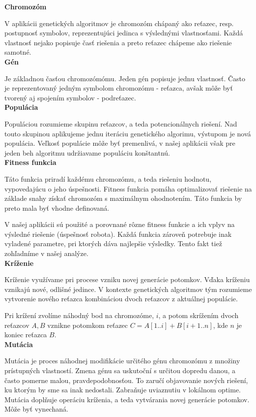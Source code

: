 \documentclass[10pt]{paper}
\begin{document}
\textbf{Chromozóm}

V aplikácii genetických algoritmov je chromozóm chápaný ako reťazec, resp. postupnosť symbolov, reprezentujúci jedinca s výslednými vlastnosťami. Každá vlastnosť nejako popisuje časť riešenia a preto reťazec chápeme ako riešenie samotné.\\

\textbf{Gén}

Je základnou časťou chromozómómu. Jeden gén popisuje jednu vlastnosť. Často je reprezentovaný jedným symbolom chromozómu - reťazca, avšak môže byť tvorený aj spojením symbolov - podreťazec.\\

\textbf{Populácia}

Populáciou rozumieme skupinu reťazcov, a teda potencionálnych riešení. Nad touto skupinou aplikujeme jednu iteráciu genetického algorimu, výstupom je nová populácia. Veľkosť populácie môže byť premenlivá, v našej aplikácii však pre jeden beh algoritmu udržiavame populáciu konštantnú.\\

\textbf{Fitness funkcia}

Táto funkcia priradí každému chromozómu, a teda riešeniu hodnotu, vypovedajúcu o jeho úspešnosti. Fitness funkcia pomáha optimalizovať riešenie na základe snahy získať chromozóm s maximálnym ohodnotením. Táto funkcia by preto mala byť vhodne definovaná.

V našej aplikácii sú použité a porovnané rôzne fitness funkcie a ich vplyv na výsledné riešenie (úspešnosť robota). Každá funkcia zároveň potrebuje inak vyladené parametre, pri ktorých dáva najlepšie výsledky. Tento fakt tiež zohľadníme v našej analýze.\\

\textbf{Kríženie}

Kríženie využívame pri procese vzniku novej generácie potomkov. Vďaka kríženiu vznikajú nové, odlišné jedince. V kontexte genetických algoritmov tým rozumieme vytvorenie nového reťazca kombináciou dvoch reťazcov z aktuálnej populácie. 

Pri krížení zvolíme náhodný bod na chromozóme, $i$, a potom skrížením dvoch reťazcov $A,B$ vznikne potomkom reťazec $C = A[1..i] + B[i+1..n]$, kde $n$ je koniec reťazca $B$.\\

\textbf{Mutácia}

Mutácia je proces náhodnej modifikácie určitého génu chromozómu z množiny prístupných vlastností. Zmena génu sa uskutoční s určitou dopredu danou, a často pomerne malou, pravdepodobnosťou. To zaručí objavovanie nových riešení, ku ktorým by sme sa inak nedostali. Zabraňuje uviaznutiu v lokálnom optime. Mutácia doplňuje operáciu kríženia, a teda vytvárania novej generácie potomkov. Môže byť vynechaná.
\end{document}

